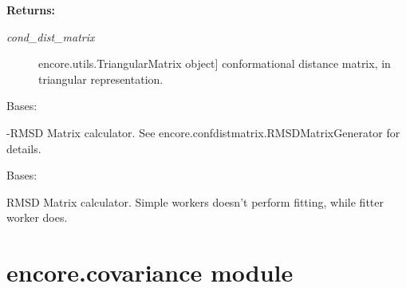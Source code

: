 \documentclass[letterpaper,10pt,english]{sphinxmanual}
\begin{document}
\begin{fulllineitems}
\begin{fulllineitems}
\begin{description}
\end{description}

\textbf{Returns:}
\begin{description}
\item[{\emph{cond\_dist\_matrix}}] \leavevmode{[}encore.utils.TriangularMatrix object{]}
conformational distance matrix, in triangular representation.

\end{description}

\end{fulllineitems}


\end{fulllineitems}


\begin{fulllineitems}
\label{index:encore.confdistmatrix.MinusRMSDMatrixGenerator}
Bases: {\hyperref[index:encore.confdistmatrix.ConformationalDistanceMatrixGenerator]{}}

-RMSD Matrix calculator. See encore.confdistmatrix.RMSDMatrixGenerator for details.

\end{fulllineitems}


\begin{fulllineitems}
\label{index:encore.confdistmatrix.RMSDMatrixGenerator}
Bases: {\hyperref[index:encore.confdistmatrix.ConformationalDistanceMatrixGenerator]{}}

RMSD Matrix calculator. Simple workers doesn't perform fitting, while fitter worker does.

\end{fulllineitems}



\section{encore.covariance module}
\label{index:module-encore.covariance}\label{index:encore-covariance-module}
\end{document}
